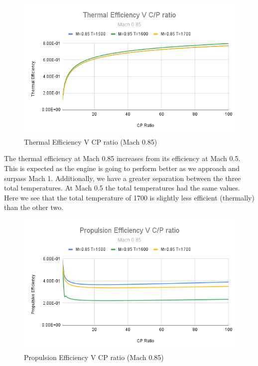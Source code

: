 \documentclass[12pt]{report}
\begin{document}
\begin{figure}[H]
    \centering
    \includegraphics[width=15.5 cm]{Thermal Efficiency V C_P ratio (Mach 0.85).png}
    \caption{Thermal Efficiency V CP ratio (Mach 0.85)}
    \label{fig: Thermal Efficiency V CP ratio (Mach 0.85)}
\end{figure}



The thermal efficiency at Mach 0.85 increases from its efficiency at Mach 0.5. This is expected as the engine is going to perform better as we approach and surpass Mach 1. Additionally, we have a greater separation between the three total temperatures.  At Mach 0.5 the total temperatures had the same values.  Here we see that the total temperature of 1700 is slightly less efficient (thermally) than the other two.


\begin{figure}[H]
    \centering
    \includegraphics[width=15.5 cm]{Propulsion Efficiency V C_P ratio (Mach 0.85).png}
    \caption{Propulsion Efficiency V CP ratio (Mach 0.85)}
    \label{fig: Propulsion Efficiency V CP ratio (Mach 0.85)}
\end{figure}
\end{document}
